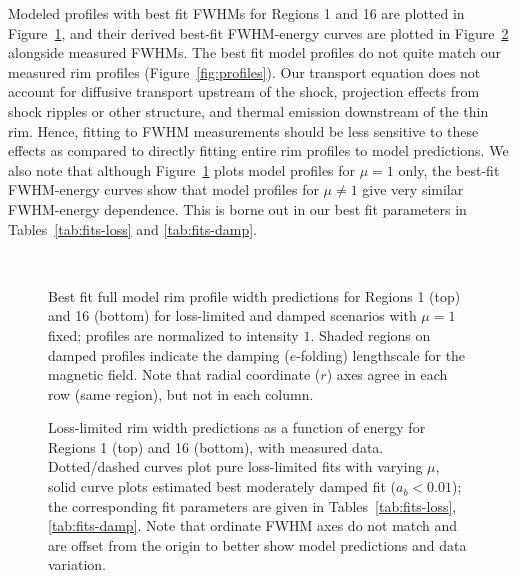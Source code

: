 \documentclass[iop, apj, numberedappendix]{emulateapj}
\begin{document}
Modeled profiles with best fit FWHMs for Regions 1 and 16 are plotted in
Figure~\ref{fig:rims}, and their derived best-fit FWHM-energy curves
are plotted in Figure~\ref{fig:fits} alongside measured FWHMs.
The best fit model profiles do not quite match our measured rim profiles
(Figure~\ref{fig:profiles}).  Our transport equation does not account for
diffusive transport upstream of the shock, projection effects from shock
ripples or other structure, and thermal emission downstream of the thin rim.
Hence, fitting to FWHM measurements should be less sensitive to these effects
as compared to directly fitting entire rim profiles to model predictions.
We also note that although Figure~\ref{fig:rims} plots model profiles for
$\mu = 1$ only, the best-fit FWHM-energy curves show that model profiles for
$\mu \neq 1$ give very similar FWHM-energy dependence.  This is borne out in
our best fit parameters in Tables~\ref{tab:fits-loss} and \ref{tab:fits-damp}.

\begin{figure}
    \centering
    \iftoggle{manuscript}{
        \epsscale{0.5}
    }{}
     \\
    \caption{Best fit full model rim profile width predictions for Regions 1
        (top) and 16 (bottom) for loss-limited and damped scenarios with
        $\mu = 1$ fixed; profiles are normalized to intensity $1$.  Shaded
        regions on damped profiles indicate the damping ($e$-folding)
        lengthscale for the magnetic field.  Note that radial coordinate ($r$)
        axes agree in each row (same region), but not in each column.
    \label{fig:rims}}
\end{figure}

\begin{figure}
    \centering
    \iftoggle{manuscript}{
        \texttt{[image: figures/energywidth-01.pdf]}
        \texttt{[image: figures/energywidth-16.pdf]}
    }{
        \texttt{[image: figures/energywidth-01.pdf]}
        \texttt{[image: figures/energywidth-16.pdf]}
    }
    \caption{Loss-limited rim width predictions as a function of energy for
    Regions 1 (top) and 16 (bottom), with measured data.  Dotted/dashed curves
    plot pure loss-limited fits with varying $\mu$, solid curve plots estimated
    best moderately damped fit ($a_b < 0.01$); the corresponding fit
    parameters are given in Tables~\ref{tab:fits-loss}, \ref{tab:fits-damp}.
    Note that ordinate FWHM axes do not match and are offset from the origin to
    better show model predictions and data variation.
    \label{fig:fits}}
\end{figure}
\end{document}
